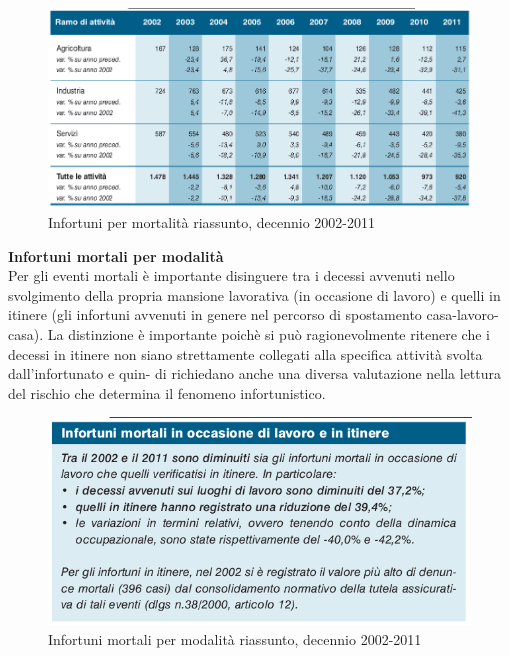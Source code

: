 \begin{figure}[H]
\centering
\includegraphics[scale=0.55]{images/analisiDiMercato/infortuniDecennioPerMortalita2}
\caption{Infortuni per mortalità riassunto, decennio 2002-2011}
\end{figure}





\textbf{Infortuni mortali per modalità}\\
Per gli eventi mortali è importante disinguere tra i decessi avvenuti nello
svolgimento della propria mansione lavorativa (in occasione di lavoro) e quelli in itinere
(gli infortuni avvenuti in genere nel percorso di spostamento casa-lavoro-casa).
La distinzione è importante poichè si può ragionevolmente ritenere che i decessi in
itinere non siano strettamente collegati alla specifica attività svolta dall’infortunato e quin-
di richiedano anche una diversa valutazione nella lettura del rischio che determina il
fenomeno infortunistico.



\begin{figure}[H]
\centering
\includegraphics[scale=0.55]{images/analisiDiMercato/infortuniDecennioMortaliPerModalita1}
\caption{Infortuni mortali per modalità riassunto, decennio 2002-2011}
\end{figure}

